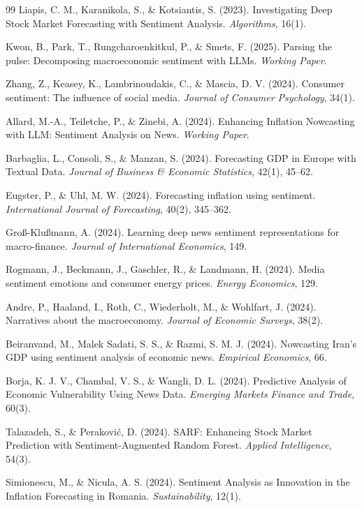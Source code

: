 \documentclass[11pt]{article}
\begin{document}
\begin{thebibliography}{99}
 Liapis, C. M., Karanikola, S., \& Kotsiantis, S. (2023). Investigating Deep Stock Market Forecasting with Sentiment Analysis. \textit{Algorithms}, 16(1).

 Kwon, B., Park, T., Rungcharoenkitkul, P., \& Smets, F. (2025). Parsing the pulse: Decomposing macroeconomic sentiment with LLMs. \textit{Working Paper}.

 Zhang, Z., Keasey, K., Lambrinoudakis, C., \& Mascia, D. V. (2024). Consumer sentiment: The influence of social media. \textit{Journal of Consumer Psychology}, 34(1).

 Allard, M.-A., Teiletche, P., \& Zinebi, A. (2024). Enhancing Inflation Nowcasting with LLM: Sentiment Analysis on News. \textit{Working Paper}.

 Barbaglia, L., Consoli, S., \& Manzan, S. (2024). Forecasting GDP in Europe with Textual Data. \textit{Journal of Business \& Economic Statistics}, 42(1), 45--62.

 Eugster, P., \& Uhl, M. W. (2024). Forecasting inflation using sentiment. \textit{International Journal of Forecasting}, 40(2), 345--362.

 Groß-Klußmann, A. (2024). Learning deep news sentiment representations for macro-finance. \textit{Journal of International Economics}, 149.

 Rogmann, J., Beckmann, J., Gaschler, R., \& Landmann, H. (2024). Media sentiment emotions and consumer energy prices. \textit{Energy Economics}, 129.

 Andre, P., Haaland, I., Roth, C., Wiederholt, M., \& Wohlfart, J. (2024). Narratives about the macroeconomy. \textit{Journal of Economic Surveys}, 38(2).

 Beiranvand, M., Malek Sadati, S. S., \& Razmi, S. M. J. (2024). Nowcasting Iran's GDP using sentiment analysis of economic news. \textit{Empirical Economics}, 66.

 Borja, K. J. V., Chambal, V. S., \& Wangli, D. L. (2024). Predictive Analysis of Economic Vulnerability Using News Data. \textit{Emerging Markets Finance and Trade}, 60(3).

 Talazadeh, S., \& Peraković, D. (2024). SARF: Enhancing Stock Market Prediction with Sentiment-Augmented Random Forest. \textit{Applied Intelligence}, 54(3).

 Simionescu, M., \& Nicula, A. S. (2024). Sentiment Analysis as Innovation in the Inflation Forecasting in Romania. \textit{Sustainability}, 12(1).


\end{thebibliography}
\end{document}
